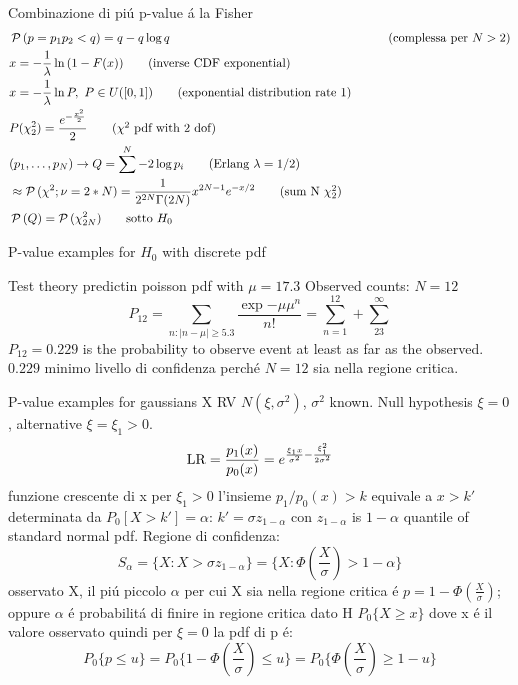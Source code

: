 \documentclass[asd-beamer.tex]{subfiles}
\begin{document}
\begin{frame}{Combinazione di pi\'u p-value \'a la Fisher}
	\begin{align*}
	&\operatorname{\mathcal{P}}{(p=p_1p_2<q)}=q-q\log{q}&\tag{complessa per $N>2$}\\
	&x=-\frac{1}{\lambda}\ln{(1-F(x))}\tag{inverse CDF exponential}\\
	&x=-\frac{1}{\lambda}\ln{P},\ P\in U([0,1])\tag{exponential distribution rate 1}\\
&P(\chi^2_2)=\frac{e^{-\frac{x^2}{2}}}{2}\tag{$\chi^2$ pdf with 2 dof}\\
	&(p_1,\ldots,p_N)\to Q=\sum^N-2\log{p_i}\tag{Erlang $\lambda=1/2$}\\
	&\approx\operatorname{\mathcal{P}}{(\chi^2;\nu=2*N)}=\frac{1}{2^{2N}\Gamma(2N)}x^{2N-1}e^{-x/2}\tag{sum N $\chi^2_2$}\\
	&\operatorname{\mathcal{P}}{(Q)}=\operatorname{\mathcal{P}}{(\chi^2_{2N})}\tag*{sotto $H_0$}
	\end{align*}
\end{frame}

\begin{wordonframe}{P-value examples for $H_0$ with discrete pdf}
\begin{block}{Test theory predictin poisson pdf with $\mu=17.3$}
Observed counts: $N=12$
\[P_{12}=\sum_{n: |n-\mu|\geq5.3}\frac{\exp{-\mu}\mu^n}{n!}=\sum_{n=1}^{12}+\sum_{23}^{\infty}\]
$P_{12}=0.229$ is the probability to observe event at least as far as the observed.
$0.229$ minimo livello di confidenza perch\'e $N=12$ sia nella regione critica.
\end{block}
\end{wordonframe}

\begin{wordonframe}{P-value examples for gaussians}
		X RV $N(\xi,\sigma^2)$, $\sigma^2$ known. Null hypothesis $\xi=0$, alternative $\xi=\xi_1>0$.
		\begin{equation*}
		\operatorname{LR}=\frac{p_1(x)}{p_0(x)}=e^{\frac{\xi_1x}{\sigma^2}-\frac{\xi_1^2}{2\sigma^2}}
		\end{equation*}
		funzione crescente di x per $\xi_1>0$ l'insieme $p_1/p_0(x)>k$ equivale a $x>k'$ determinata da $P_0[X>k']=\alpha$: $k'=\sigma z_{1-\alpha}$ con $z_{1-\alpha}$ is $1-\alpha$ quantile of standard normal pdf.
		Regione di confidenza:
		\begin{equation*}
		S_{\alpha}=\{X: X>\sigma z_{1-\alpha}\}=\{X: \Phi(\frac{X}{\sigma})>1-\alpha\}
		\end{equation*}
		osservato X, il pi\'u piccolo $\alpha$ per cui X sia nella regione critica \'e $p=1-\Phi(\frac{X}{\sigma})$; oppure $\alpha$ \'e probabilit\'a di finire in regione critica dato H $P_0\{X\geq x\}$ dove x \'e il valore osservato quindi per $\xi=0$ la pdf di p \'e:
		\begin{equation*}
		P_0\{p\leq u\}=P_0\{1-\Phi(\frac{X}{\sigma})\leq u\}=P_0\{\Phi(\frac{X}{\sigma})\geq 1-u\}
		\end{equation*}
\end{wordonframe}
\end{document}
